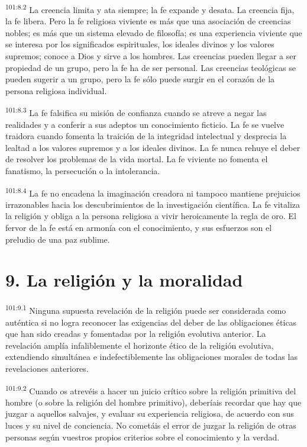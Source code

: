 \documentclass[twoside, 11pt]{book}
\begin{document}
\par
\textsuperscript{101:8.2} La creencia limita y ata siempre; la fe expande y desata. La creencia fija, la fe libera. Pero la fe religiosa viviente es más que una asociación de creencias nobles; es más que un sistema elevado de filosofía; es una experiencia viviente que se interesa por los significados espirituales, los ideales divinos y los valores supremos; conoce a Dios y sirve a los hombres. Las creencias pueden llegar a ser propiedad de un grupo, pero la fe ha de ser personal. Las creencias teológicas se pueden sugerir a un grupo, pero la fe sólo puede surgir en el corazón de la persona religiosa individual.

\par
\textsuperscript{101:8.3} La fe falsifica su misión de confianza cuando se atreve a negar las realidades y a conferir a sus adeptos un conocimiento ficticio. La fe se vuelve traidora cuando fomenta la traición de la integridad intelectual y desprecia la lealtad a los valores supremos y a los ideales divinos. La fe nunca rehuye el deber de resolver los problemas de la vida mortal. La fe viviente no fomenta el fanatismo, la persecución o la intolerancia.

\par
\textsuperscript{101:8.4} La fe no encadena la imaginación creadora ni tampoco mantiene prejuicios irrazonables hacia los descubrimientos de la investigación científica. La fe vitaliza la religión y obliga a la persona religiosa a vivir heroicamente la regla de oro. El fervor de la fe está en armonía con el conocimiento, y sus esfuerzos son el preludio de una paz sublime.

\section*{9. La religión y la moralidad}
\par
\textsuperscript{101:9.1} Ninguna supuesta revelación de la religión puede ser considerada como auténtica si no logra reconocer las exigencias del deber de las obligaciones éticas que han sido creadas y fomentadas por la religión evolutiva anterior. La revelación amplía infaliblemente el horizonte ético de la religión evolutiva, extendiendo simultánea e indefectiblemente las obligaciones morales de todas las revelaciones anteriores.

\par
\textsuperscript{101:9.2} Cuando os atrevéis a hacer un juicio crítico sobre la religión primitiva del hombre (o sobre la religión del hombre primitivo), deberíais recordar que hay que juzgar a aquellos salvajes, y evaluar su experiencia religiosa, de acuerdo con sus luces y su nivel de conciencia. No cometáis el error de juzgar la religión de otras personas según vuestros propios criterios sobre el conocimiento y la verdad.
\end{document}
